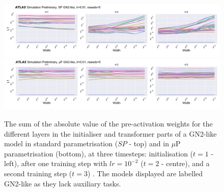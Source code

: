 \begin{figure}[h!]
  \centering
  \includegraphics[width=\textwidth]{Images/FTAG/GN/HPO/spweights.png}\\
  \includegraphics[width=\textwidth]{Images/FTAG/GN/HPO/mupweights.png}
  \caption{The sum of the absolute value of the pre-activation weights for the different layers in the initialiser and transformer parts of a GN2-like model in standard parametrisation ($SP$ - top) and in $\mu$P parametrisation (bottom), at three timesteps: initialisation ($t=1$ - left), after one training step with $lr = 10^{-2}$ ($t=2$ - centre), and a second training step ($t=3$) \cite{publicplotMUP}. The models displayed are labelled GN2-like as they lack auxiliary tasks.}
  \label{fig:muspweights}
\end{figure} 

